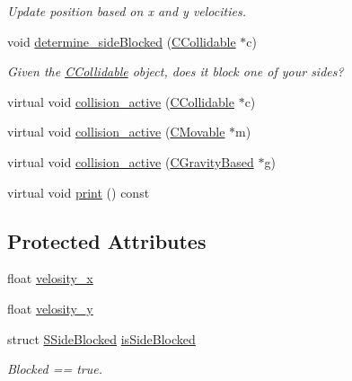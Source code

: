 \begin{DoxyCompactItemize}
\begin{DoxyCompactList}\small\item\em Update position based on x and y velocities. \end{DoxyCompactList}\item 
void \hyperlink{classengine_1_1CMovable_a9643f34424f25ec389cb784c84988f14}{determine\-\_\-side\-Blocked} (\hyperlink{classengine_1_1CCollidable}{C\-Collidable} $\ast$c)
\begin{DoxyCompactList}\small\item\em Given the \hyperlink{classengine_1_1CCollidable}{C\-Collidable} object, does it block one of your sides? \end{DoxyCompactList}\item 
virtual void \hyperlink{classengine_1_1CMovable_a7ac299dcc08c6c783b2d77ec665041f4}{collision\-\_\-active} (\hyperlink{classengine_1_1CCollidable}{C\-Collidable} $\ast$c)
\item 
virtual void \hyperlink{classengine_1_1CMovable_ad04d949e3d7e2e182df9fbffae48ecd8}{collision\-\_\-active} (\hyperlink{classengine_1_1CMovable}{C\-Movable} $\ast$m)
\item 
virtual void \hyperlink{classengine_1_1CMovable_ae4173fad2cbd60a3929c42aee9916cb4}{collision\-\_\-active} (\hyperlink{classengine_1_1CGravityBased}{C\-Gravity\-Based} $\ast$g)
\item 
virtual void \hyperlink{classengine_1_1CMovable_a18299a0373464c4e1aadcdc9824eed9a}{print} () const 
\end{DoxyCompactItemize}
\subsection*{Protected Attributes}
\begin{DoxyCompactItemize}
\item 
float \hyperlink{classengine_1_1CMovable_a7bc34defa8ea4190a6c3011ef254e48b}{velosity\-\_\-x}
\item 
float \hyperlink{classengine_1_1CMovable_a7a1a4581926122ae31753261d1d35cf3}{velosity\-\_\-y}
\item 
struct \hyperlink{structengine_1_1SSideBlocked}{S\-Side\-Blocked} \hyperlink{classengine_1_1CMovable_afa7eb7bff0a1475aab175c9de7cd428a}{is\-Side\-Blocked}
\begin{DoxyCompactList}\small\item\em Blocked == true. \end{DoxyCompactList}\end{DoxyCompactItemize}


